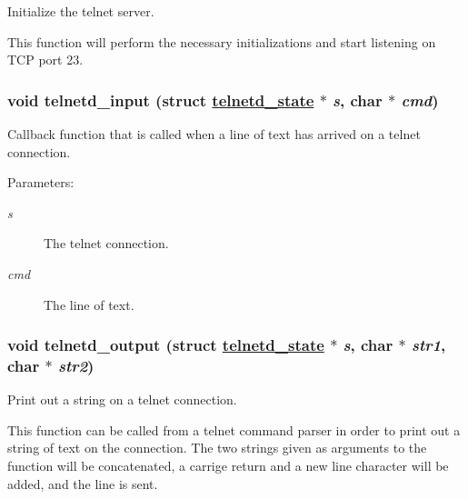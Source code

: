 Initialize the telnet server. 

This function will perform the necessary initializations and start listening on TCP port 23. \hypertarget{a00081_ge639174c3eb987213a3ff0b1e138da26}{
\subsubsection[telnetd\_\-input]{\setlength{\rightskip}{0pt plus 5cm}void telnetd\_\-input (struct \hyperlink{a00027}{telnetd\_\-state} $\ast$ {\em s}, char $\ast$ {\em cmd})}}
\label{a00081_ge639174c3eb987213a3ff0b1e138da26}


Callback function that is called when a line of text has arrived on a telnet connection. 

\begin{Desc}
\item[Parameters:]
\begin{description}
\item[{\em s}]The telnet connection.\item[{\em cmd}]The line of text. \end{description}
\end{Desc}
\hypertarget{a00081_g24ecabdebc734cb350bdd766c0cddf1c}{
\subsubsection[telnetd\_\-output]{\setlength{\rightskip}{0pt plus 5cm}void telnetd\_\-output (struct \hyperlink{a00027}{telnetd\_\-state} $\ast$ {\em s}, char $\ast$ {\em str1}, char $\ast$ {\em str2})}}
\label{a00081_g24ecabdebc734cb350bdd766c0cddf1c}


Print out a string on a telnet connection. 

This function can be called from a telnet command parser in order to print out a string of text on the connection. The two strings given as arguments to the function will be concatenated, a carrige return and a new line character will be added, and the line is sent.

